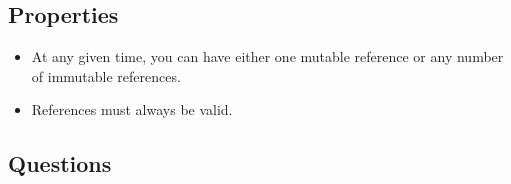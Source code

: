 \clearpage
\subsection{Properties}
\begin{itemize}
\item At any given time, you can have either one mutable reference or any number of immutable references.
\item References must always be valid.
\end{itemize}

\subsection{Questions}
%
%

%







 


